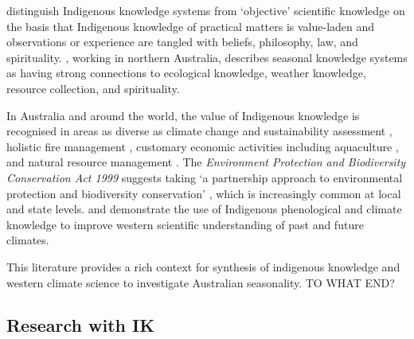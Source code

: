 
\citet{turner2009} distinguish Indigenous knowledge systems from `objective'
scientific knowledge on the basis that Indigenous knowledge of practical
matters is value-laden and observations or experience are tangled with beliefs,
philosophy, law, and spirituality.  \citet{woodward2012b}, working in northern
Australia, describes seasonal knowledge systems as having strong connections
to ecological knowledge, weather knowledge, resource collection, and spirituality.




In Australia and around the world, the value of Indigenous knowledge is recognised
in areas as diverse as climate change and sustainability assessment
\citep[eg.][]{cochran2015}, holistic fire management \citep[eg.][]{clarke2009,price2012},
customary economic activities including aquaculture \citep{woodward2012a}, and
natural resource management \citep[eg.][]{prober2011}.  The \textit{Environment
Protection and Biodiversity Conservation Act 1999} suggests taking `a
partnership approach to environmental protection and biodiversity conservation'
\citep{ens2012}, which is increasingly common at local and state levels.
%
\citet{green2010a} and \citet{clarke2009}
demonstrate the use of Indigenous phenological and climate knowledge to improve
western scientific understanding of past and future climates.








This literature provides a rich context for synthesis of indigenous knowledge
and western climate science to investigate Australian seasonality.
TO WHAT END?



\subsection{Research with IK}

